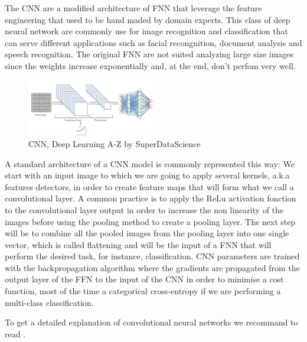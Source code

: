 \documentclass[6pt,letter]{article}\usepackage[]{graphicx}\usepackage[]{color}
\begin{document}
The \ac{CNN} are a modified architecture of \ac{FNN} that leverage the feature engineering that used to be hand maded by domain experts. This class of deep neural network are commonly use for image recognition and classification that can serve different applications such as facial recongnition, document analysis and speech recognition. The original \ac{FNN} are not suited analyzing large size images since the weights increase exponentially and, at the end, don't perfom very well.\\
\begin{figure}
  \begin{center}
    \includegraphics[width=0.5\textwidth]{figure/CNN_process.png}
  \end{center}
  \caption{CNN, Deep Learning A-Z by SuperDataScience}
  \label{fig:attention}
\end{figure}
A standard architecture of a CNN model is commonly represented this way: We start with an input image to which we are going to apply several kernels, a.k.a features detectors, in order to create feature maps that will form what we call a convolutional layer. A common practice is to apply the ReLu activation fonction to the convolutional layer output in order to increase the non linearity of the images before using the pooling method to create a pooling layer. The next step will be to combine all the pooled images from the pooling layer into one single vector, which is called flattening and will be the input of a FNN that will perform the desired task, for instance, classification. CNN parameters are trained with the backpropagation algorithm where the gradients are propagated from the output layer of the FFN to the input of the CNN in order to minimise a cost function, most of the time a categorical cross-entropy if we are performing a multi-class classification. 


To get a detailed explanation of convolutional neural networks we recommand to read \cite[Chapter 9]{Goodfellow-et-al-2016}.\\
\end{document}
